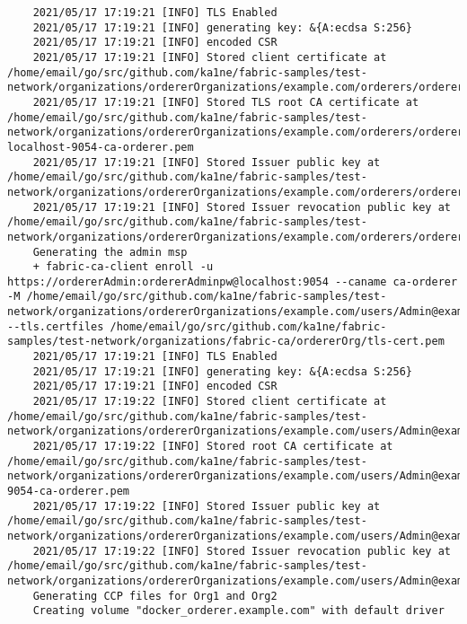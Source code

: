 \begin{lstlisting}
    2021/05/17 17:19:21 [INFO] TLS Enabled
    2021/05/17 17:19:21 [INFO] generating key: &{A:ecdsa S:256}
    2021/05/17 17:19:21 [INFO] encoded CSR
    2021/05/17 17:19:21 [INFO] Stored client certificate at /home/email/go/src/github.com/ka1ne/fabric-samples/test-network/organizations/ordererOrganizations/example.com/orderers/orderer.example.com/tls/signcerts/cert.pem
    2021/05/17 17:19:21 [INFO] Stored TLS root CA certificate at /home/email/go/src/github.com/ka1ne/fabric-samples/test-network/organizations/ordererOrganizations/example.com/orderers/orderer.example.com/tls/tlscacerts/tls-localhost-9054-ca-orderer.pem
    2021/05/17 17:19:21 [INFO] Stored Issuer public key at /home/email/go/src/github.com/ka1ne/fabric-samples/test-network/organizations/ordererOrganizations/example.com/orderers/orderer.example.com/tls/IssuerPublicKey
    2021/05/17 17:19:21 [INFO] Stored Issuer revocation public key at /home/email/go/src/github.com/ka1ne/fabric-samples/test-network/organizations/ordererOrganizations/example.com/orderers/orderer.example.com/tls/IssuerRevocationPublicKey
    Generating the admin msp
    + fabric-ca-client enroll -u https://ordererAdmin:ordererAdminpw@localhost:9054 --caname ca-orderer -M /home/email/go/src/github.com/ka1ne/fabric-samples/test-network/organizations/ordererOrganizations/example.com/users/Admin@example.com/msp --tls.certfiles /home/email/go/src/github.com/ka1ne/fabric-samples/test-network/organizations/fabric-ca/ordererOrg/tls-cert.pem
    2021/05/17 17:19:21 [INFO] TLS Enabled
    2021/05/17 17:19:21 [INFO] generating key: &{A:ecdsa S:256}
    2021/05/17 17:19:21 [INFO] encoded CSR
    2021/05/17 17:19:22 [INFO] Stored client certificate at /home/email/go/src/github.com/ka1ne/fabric-samples/test-network/organizations/ordererOrganizations/example.com/users/Admin@example.com/msp/signcerts/cert.pem
    2021/05/17 17:19:22 [INFO] Stored root CA certificate at /home/email/go/src/github.com/ka1ne/fabric-samples/test-network/organizations/ordererOrganizations/example.com/users/Admin@example.com/msp/cacerts/localhost-9054-ca-orderer.pem
    2021/05/17 17:19:22 [INFO] Stored Issuer public key at /home/email/go/src/github.com/ka1ne/fabric-samples/test-network/organizations/ordererOrganizations/example.com/users/Admin@example.com/msp/IssuerPublicKey
    2021/05/17 17:19:22 [INFO] Stored Issuer revocation public key at /home/email/go/src/github.com/ka1ne/fabric-samples/test-network/organizations/ordererOrganizations/example.com/users/Admin@example.com/msp/IssuerRevocationPublicKey
    Generating CCP files for Org1 and Org2
    Creating volume "docker_orderer.example.com" with default driver

\end{lstlisting}
